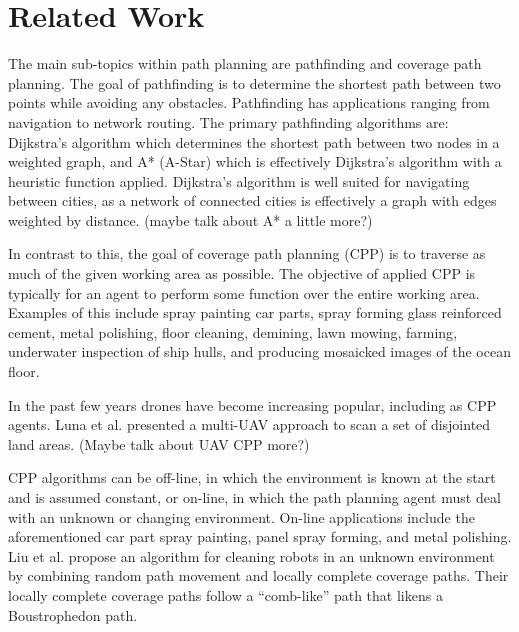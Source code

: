 \chapter{Related Work}\label{related_work}

The main sub-topics within path planning are pathfinding and coverage path planning.
The goal of pathfinding is to determine the shortest path between two points while avoiding any obstacles.
Pathfinding has applications ranging from navigation to network routing.
The primary pathfinding algorithms are: Dijkstra's algorithm\cite{Dijkstra, Improved_Dijkstra} which determines the shortest path between two nodes in a weighted graph, and A* (A-Star)\cite{A_Star_lit_review, A_Star_beginners, A_Star_in_computer_games} which is effectively Dijkstra's algorithm with a heuristic function applied.
Dijkstra's algorithm is well suited for navigating between cities\cite{Dijkstra_for_railroads}, as a network of connected cities is effectively a graph with edges weighted by distance.
(maybe talk about A* a little more?)

In contrast to this, the goal of coverage path planning (CPP) is to traverse as much of the given working area as possible.
The objective of applied CPP is typically for an agent to perform some function over the entire working area.
Examples of this include spray painting car parts\cite{Automatic_spray_painting_path}, spray forming glass reinforced cement\cite{Robotic_grc_spraying}, metal polishing\cite{Metal_polishing_robot_sys}, floor cleaning\cite{CCPP_guidance_for_cleaning_robots}, demining\cite{CPP_demining}, lawn mowing\cite{CPP_autonomous_lawn_mower}, farming\cite{Vision_perception_auto_harvester, CPP_alg_agriculture}, underwater inspection of ship hulls\cite{CPP_inspect_complex_structures}, and producing mosaicked images of the ocean floor\cite{Terrain_covering_AUV}.

In the past few years drones have become increasing popular, including as CPP agents\cite{CPP_UAV_survey, CPP_2D_convex_regions_uav, CPP_multi_UAV, CPP_spraying_drones}.
Luna et al. presented a multi-UAV approach to scan a set of disjointed land areas\cite{CPP_multi_UAV}.
(Maybe talk about UAV CPP more?)

CPP algorithms can be off-line, in which the environment is known at the start and is assumed constant, or on-line, in which the path planning agent must deal with an unknown or changing environment\cite{CPP_survey_for_robotics}.
On-line applications include the aforementioned car part spray painting, panel spray forming\cite{Robotic_grc_spraying}, and metal polishing.
Liu et al. propose an algorithm for cleaning robots in an unknown environment by combining random path movement and locally complete coverage paths\cite{CCPP_cleaning_robots}.
Their locally complete coverage paths follow a ``comb-like'' path that likens a Boustrophedon path.


